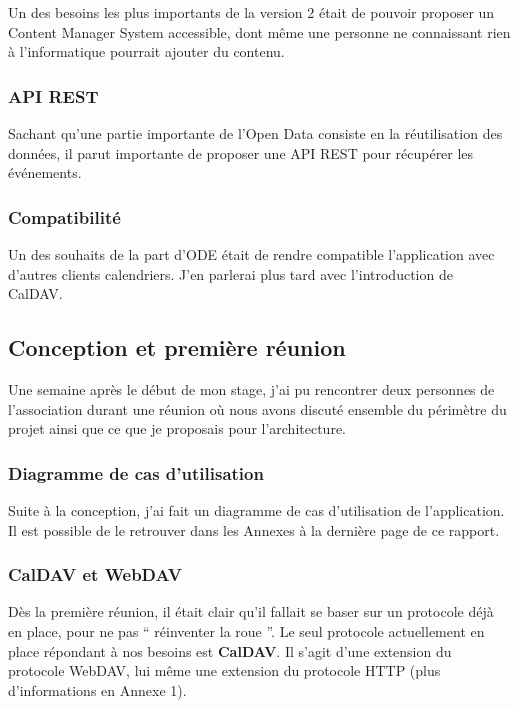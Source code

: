 Un des besoins les plus importants de la version 2 était de pouvoir proposer un Content Manager System accessible, dont même une personne ne connaissant rien à l'informatique pourrait ajouter du contenu.

\subsubsection*{API REST}

Sachant qu'une partie importante de l'Open Data consiste en la réutilisation des données, il parut importante de proposer une API REST pour récupérer les événements.

\subsubsection*{Compatibilité}

Un des souhaits de la part d'ODE était de rendre compatible l'application avec d'autres clients calendriers. J'en parlerai plus tard avec l'introduction de CalDAV.

\subsection{Conception et première réunion}

Une semaine après le début de mon stage, j'ai pu rencontrer deux personnes de l'association durant une réunion où nous avons discuté ensemble du périmètre du projet ainsi que ce que je proposais pour l'architecture.

\subsubsection*{Diagramme de cas d'utilisation}

Suite à la conception, j'ai fait un diagramme de cas d'utilisation de l'application. Il est possible de le retrouver dans les Annexes à la dernière page de ce rapport.

\subsubsection*{CalDAV et WebDAV}

Dès la première réunion, il était clair qu'il fallait se baser sur un protocole déjà en place, pour ne pas `` réinventer la roue ''. Le seul protocole actuellement en place répondant à nos besoins est \textbf{CalDAV}. Il s'agit d'une extension du protocole WebDAV, lui même une extension du protocole HTTP (plus d'informations en Annexe 1). 


